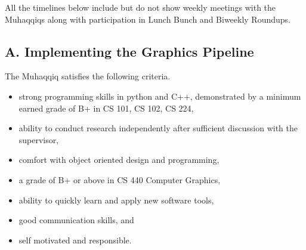\documentclass{article}
\begin{document}

All the timelines below include but do not show weekly meetings with the Muhaqqiqs along with participation in Lunch Bunch and Biweekly Roundups.

\subsection*{A. Implementing the Graphics Pipeline}
The Muhaqqiq satisfies the following criteria.
\begin{itemize}
  \item strong programming skills in python and C++, demonstrated by a minimum earned grade of B+ in CS 101, CS 102, CS 224,
  \item ability to conduct research independently after sufficient discussion with the supervisor,
  \item comfort with object oriented design and programming,
  \item a grade of B+ or above in CS 440 Computer Graphics,
  \item ability to quickly learn and apply new software tools,
  \item good communication skills, and
  \item self motivated and responsible.
\end{itemize}
\end{document}
